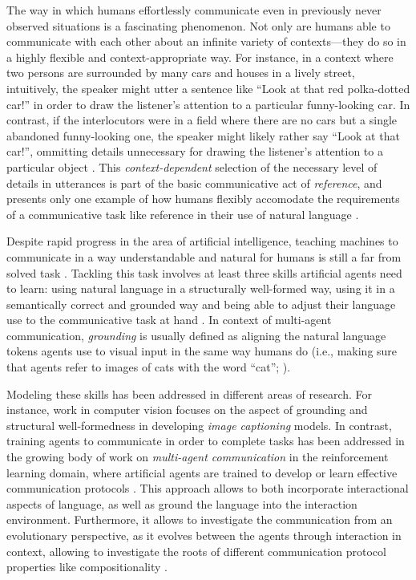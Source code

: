The way in which humans effortlessly communicate even in previously never observed situations is a fascinating phenomenon. Not only are humans able to communicate with each other about an infinite variety of contexts---they do so in a highly flexible and context-appropriate way. For instance, in a context where two persons are surrounded by many cars and houses in a lively street, intuitively, the speaker might utter a sentence like ``Look at that red polka-dotted car!'' in order to draw the listener's attention to a particular funny-looking car. In contrast, if the interlocutors were in a field where there are no cars but a single abandoned funny-looking one, the speaker might likely rather say ``Look at that car!'', ommitting details unnecessary for drawing the listener's attention to a particular object \parencite[cf.][]{graf2016animal, degen2020redundancy}. This \textit{context-dependent} selection of the necessary level of details in utterances is part of the basic communicative act of \textit{reference}, and presents only one example of how humans flexibly accomodate the requirements of a communicative task like reference in their use of natural language \parencite{searle1969speech, grice1975logic}.

Despite rapid progress in the area of artificial intelligence, teaching machines to communicate in a way understandable and natural for humans is still a far from solved task \parencite{lazaridou2020emergent, lake2017building, lecun2015deep}. Tackling this task involves at least three skills artificial agents need to learn: using natural language in a structurally well-formed way, using it in a semantically correct and grounded way and being able to adjust their language use to the communicative task at hand \parencite{lazaridou2020emergent}. In context of multi-agent communication, \textit{grounding} is usually defined as aligning the natural language tokens agents use to visual input in the same way humans do (i.e., making sure that agents refer to images of cats with the word ``cat''; \cite{jurafsky2000speech}).

Modeling these skills has been addressed in different areas of research. For instance, work in computer vision focuses on the aspect of grounding and structural well-formedness in developing \textit{image captioning} models.
In contrast, training agents to communicate in order to complete tasks has been addressed in the growing body of work on \textit{multi-agent communication} in the reinforcement learning domain, where artificial agents are trained to develop or learn effective communication protocols \parencite[e.g.,][]{foerster2016learning, lazaridou2020emergent}.
This approach allows to both incorporate interactional aspects of language, as well as ground the language into the interaction environment. Furthermore, it allows to investigate the communication from an evolutionary perspective, as it evolves between the agents through interaction in context, allowing to investigate the roots of different communication protocol properties like compositionality \parencite{lazaridou2020emergent}. 

